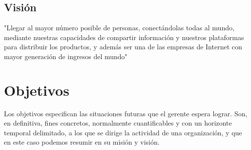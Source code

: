 \subsection{Visión}

"Llegar al mayor número posible de personas, conectándolas todas al mundo, mediante nuestras capacidades de compartir información y nuestros plataformas para distribuir los productos, y además ser una de las empresas de Internet con mayor generación de ingresos del mundo"

\section{Objetivos}

Los objetivos especifican las situaciones futuras que el gerente espera lograr. Son, en definitiva, fines concretos, normalmente cuantificables y con un horizonte temporal delimitado, a los que se dirige la actividad de una organización, y que en este caso podemos resumir en su misión y visión.